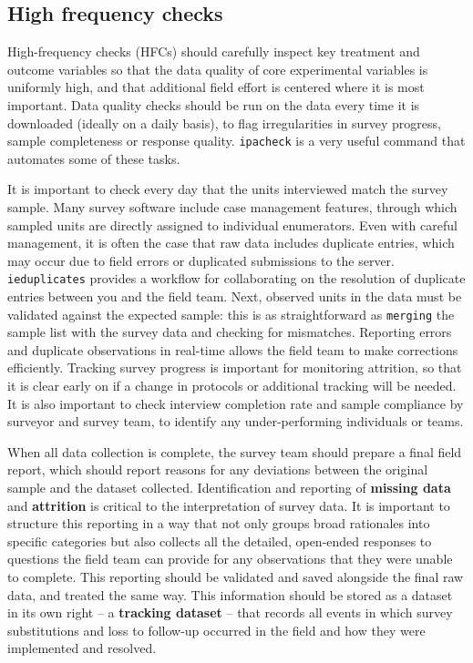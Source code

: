 \subsection{High frequency checks}
High-frequency checks (HFCs) should carefully inspect key treatment and outcome variables so that the data quality of core experimental variables is uniformly high, and that additional field effort is centered where it is most important.
Data quality checks should be run on the data every time it is downloaded (ideally on a daily basis), to flag irregularities in survey progress, sample completeness or response quality. \texttt{ipacheck}
is a very useful command that automates some of these tasks.

It is important to check every day that the units interviewed match the survey sample.
Many survey software include case management features, through which sampled units are directly assigned to individual enumerators.
Even with careful management, it is often the case that raw data includes duplicate entries, which may occur due to field errors or duplicated submissions to the server.
\texttt{ieduplicates}
provides a workflow for collaborating on the resolution of duplicate entries between you and the field team.
Next, observed units in the data must be validated against the expected sample:
this is as straightforward as \texttt{merging} the sample list with the survey data and checking for mismatches.
Reporting errors and duplicate observations in real-time allows the field team to make corrections efficiently.
Tracking survey progress is important for monitoring attrition, so that it is clear early on if a change in protocols or additional tracking will be needed.
It is also important to check interview completion rate and sample compliance by surveyor and survey team, to identify any under-performing individuals or teams.

When all data collection is complete, the survey team should prepare a final field report, 
which should report reasons for any deviations between the original sample and the dataset collected.
Identification and reporting of \textbf{missing data} and \textbf{attrition} is critical to the interpretation of survey data.
It is important to structure this reporting in a way that not only groups broad rationales into specific categories
but also collects all the detailed, open-ended responses to questions the field team can provide for any observations that they were unable to complete.
This reporting should be validated and saved alongside the final raw data, and treated the same way.
This information should be stored as a dataset in its own right -- a \textbf{tracking dataset} -- that records all events in which survey substitutions
and loss to follow-up occurred in the field and how they were implemented and resolved.

